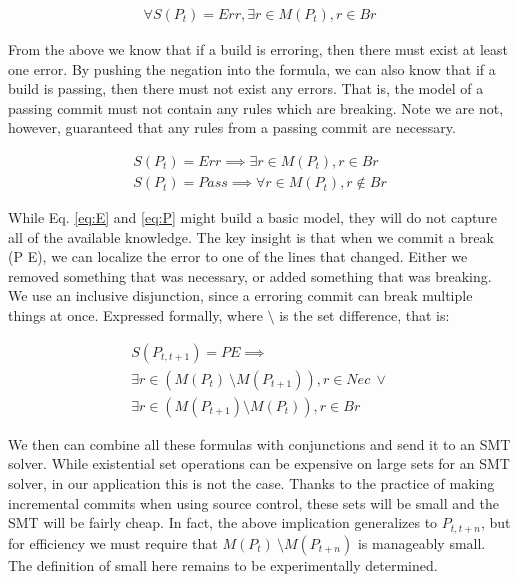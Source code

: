 \begin{align}
  \forall S(P_t)=Err, \exists r \in M(P_t), r \in Br \label{eq:E1}
\end{align}

From the above we know that if a build is erroring, then there must exist at least one error.
By pushing the negation into the formula, we can also know that if a build is passing, then there must not exist any errors.
That is, the model of a passing commit must not contain any rules which are breaking.
Note we are not, however, guaranteed that any rules from a passing commit are necessary.


\begin{align}
  S(P_t) = Err \implies \exists r \in  M (P_t), r \in Br \label{eq:E}\\
  S(P_t) = Pass \implies \forall r \in  M (P_t), r \notin Br \label{eq:P}
\end{align}

While Eq. \ref{eq:E} and \ref{eq:P} might build a basic model, they will do not capture all of the available knowledge.
The key insight is that when we commit a break (P E), we can localize the error to one of the lines that changed.
Either we removed something that was necessary, or added something that was breaking.
We use an inclusive disjunction, since a erroring commit can break multiple things at once.
Expressed formally, where $\setminus$ is the set difference, that is:


\begin{align}
  S(P_{t,t+1}) = PE \implies \nonumber \\
  \exists r \in (M(P_{t})\ \setminus M(P_{t+1})), r \in Nec\ \lor \nonumber \\
  \exists r \in (M(P_{t+1}) \setminus M(P_{t})), r \in Br \label{eq:PE}
\end{align}

We then can combine all these formulas with conjunctions and send it to an SMT solver.
While existential set operations can be expensive on large sets for an SMT solver, in our application this is not the case.
Thanks to the practice of making incremental commits when using source control, these sets will be small and the SMT will be fairly cheap.
In fact, the above implication generalizes to $P_{t,t+n}$, but for efficiency we must require that $M(P_{t})\ \setminus M(P_{t+n})$ is manageably small.
The definition of small here remains to be experimentally determined.
